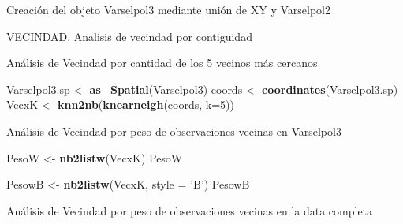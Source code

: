 \documentclass[11pt,]{article}
\newenvironment{Shaded}{\begin{snugshade}}{\end{snugshade}}
\newcommand{\KeywordTok}[1]{\textcolor[rgb]{0.13,0.29,0.53}{\textbf{#1}}}
\newcommand{\DataTypeTok}[1]{\textcolor[rgb]{0.13,0.29,0.53}{#1}}
\newcommand{\DecValTok}[1]{\textcolor[rgb]{0.00,0.00,0.81}{#1}}
\newcommand{\StringTok}[1]{\textcolor[rgb]{0.31,0.60,0.02}{#1}}
\newcommand{\OperatorTok}[1]{\textcolor[rgb]{0.81,0.36,0.00}{\textbf{#1}}}
\newcommand{\NormalTok}[1]{#1}
\begin{document}
Creación del objeto Varselpol3 mediante unión de XY y Varselpol2

\begin{Shaded}
\end{Shaded}

VECINDAD. Analisis de vecindad por contiguidad

\begin{Shaded}
\end{Shaded}

Análisis de Vecindad por cantidad de los 5 vecinos más cercanos

\begin{Shaded}
\begin{Highlighting}[]
\NormalTok{Varselpol3.sp <-}\StringTok{ }\KeywordTok{as_Spatial}\NormalTok{(Varselpol3)}
\NormalTok{coords <-}\StringTok{ }\KeywordTok{coordinates}\NormalTok{(Varselpol3.sp)}
\NormalTok{VecxK <-}\StringTok{ }\KeywordTok{knn2nb}\NormalTok{(}\KeywordTok{knearneigh}\NormalTok{(coords, }\DataTypeTok{k=}\DecValTok{5}\NormalTok{))}
\end{Highlighting}
\end{Shaded}

Análisis de Vecindad por peso de observaciones vecinas en Varselpol3

\begin{Shaded}
\begin{Highlighting}[]
\NormalTok{PesoW <-}\StringTok{ }\KeywordTok{nb2listw}\NormalTok{(VecxK)}
\NormalTok{PesoW}

\NormalTok{PesowB <-}\StringTok{ }\KeywordTok{nb2listw}\NormalTok{(VecxK, }\DataTypeTok{style =} \StringTok{'B'}\NormalTok{)}
\NormalTok{PesowB}
\end{Highlighting}
\end{Shaded}

Análisis de Vecindad por peso de observaciones vecinas en la data
completa

\begin{Shaded}
\end{Shaded}
\end{document}
